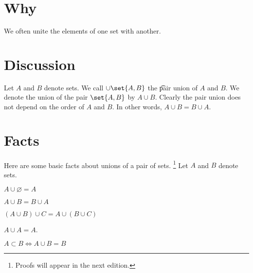 
\section*{Why}

We often unite the elements of one set with another.

\section*{Discussion}

Let $A$ and $B$ denote sets.
We call $\cup \set{A, B}$ the \t{pair union} of $A$ and $B$.
We denote the union of the pair $\set{A, B}$ by $A \cup B$.
Clearly the pair union does not depend on the order of $A$ and $B$.
In other words, $A \cup B = B \cup A$.

\section*{Facts}

Here are some basic facts about unions of a pair of sets.
    \ifhmode\unskip\fi\footnote{
Proofs will appear in the next edition.
    }
Let $A$ and $B$ denote sets.

\begin{proposition}

\label{pair_unions:identity_element}$A \cup \varnothing = A$\end{proposition}
\begin{proposition}[Commutativity]
$A \cup B = B \cup A$\end{proposition}
\begin{proposition}[Commutativity]
$(A \cup B) \cup C = A \cup (B \cup C)$\end{proposition}
\begin{proposition}[Idempotence]
$A \cup A = A$.\end{proposition}
\begin{proposition}
$A \subset B \iff A \cup B = B$\end{proposition}
\blankpage